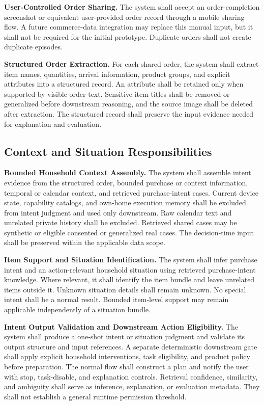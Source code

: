 \documentclass[conference]{IEEEtran}
\begin{document}
\textbf{User-Controlled Order Sharing.} The system shall accept an order-completion screenshot or equivalent user-provided order record through a mobile sharing flow. A future commerce-data integration may replace this manual input, but it shall not be required for the initial prototype. Duplicate orders shall not create duplicate episodes.

\textbf{Structured Order Extraction.} For each shared order, the system shall extract item names, quantities, arrival information, product groups, and explicit attributes into a structured record. An attribute shall be retained only when supported by visible order text. Sensitive item titles shall be removed or generalized before downstream reasoning, and the source image shall be deleted after extraction. The structured record shall preserve the input evidence needed for explanation and evaluation.

\subsection{Context and Situation Responsibilities}
\textbf{Bounded Household Context Assembly.} The system shall assemble intent evidence from the structured order, bounded purchase or context information, temporal or calendar context, and retrieved purchase-intent cases. Current device state, capability catalogs, and own-home execution memory shall be excluded from intent judgment and used only downstream. Raw calendar text and unrelated private history shall be excluded. Retrieved shared cases may be synthetic or eligible consented or generalized real cases. The decision-time input shall be preserved within the applicable data scope.

\textbf{Item Support and Situation Identification.} The system shall infer purchase intent and an action-relevant household situation using retrieved purchase-intent knowledge. Where relevant, it shall identify the item bundle and leave unrelated items outside it. Unknown situation details shall remain unknown. No special intent shall be a normal result. Bounded item-level support may remain applicable independently of a situation bundle.

\textbf{Intent Output Validation and Downstream Action Eligibility.} The system shall produce a one-shot intent or situation judgment and validate its output structure and input references. A separate deterministic downstream gate shall apply explicit household interventions, task eligibility, and product policy before preparation. The normal flow shall construct a plan and notify the user with stop, task-disable, and explanation controls. Retrieval confidence, similarity, and ambiguity shall serve as inference, explanation, or evaluation metadata. They shall not establish a general runtime permission threshold.
\end{document}
